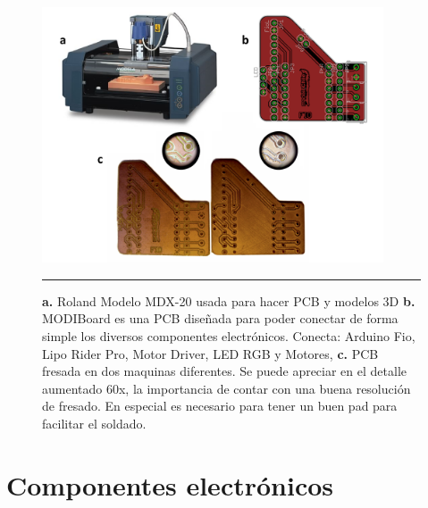 \begin{figure}[htbp]
	\centering
		\includegraphics[width=0.9\textwidth]{./Figures/modi/pcb.png}
		\rule{35em}{0.5pt}
	\caption[Fabricación de PCB]{\textbf{a.} Roland Modelo MDX-20 usada para hacer PCB y modelos 3D \textbf{b.} MODIBoard es una PCB diseñada para poder conectar de forma simple los diversos componentes electrónicos. Conecta: Arduino Fio, Lipo Rider Pro, Motor Driver, LED RGB y Motores, \textbf{c. }PCB fresada en dos maquinas diferentes. Se puede apreciar en el detalle aumentado 60x, la importancia de contar con una buena resolución de fresado. En especial es necesario para tener un buen pad para facilitar el soldado.}
	\label{fig:pcb}
\end{figure}


\section{Componentes electrónicos}

